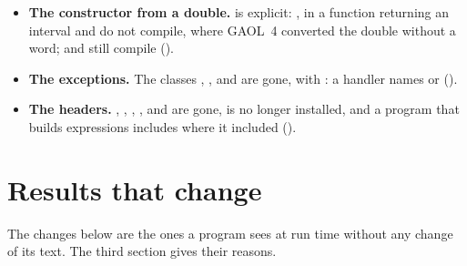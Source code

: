\documentclass[12pt,a4paper,twoside,openright]{book}
\begin{document}
\begin{itemize}
   becomes ,
  which gives the empty set for bounds in the wrong order. 
  and , which these constructors made ambiguous, compile.
\item[$\bullet$] \textbf{The constructor from a double.}
   is explicit: ,
   in a function returning an interval and 
  do not compile, where GAOL~4 converted the double without a word;
   and  still compile ().
\item[$\bullet$] \textbf{The exceptions.} The classes ,
  ,  and
   are gone, with
  : a handler names
   or 
  ().
\item[$\bullet$] \textbf{The headers.} ,
  , ,
  ,  and
   are gone,  is no
  longer installed, and a program that builds expressions includes
   where it included 
  ().
\end{itemize}

\section{Results that change}\label{sec:migration-results}
%

The changes below are the ones a program sees at run time without any
change of its text. The third section gives their reasons.
\end{document}

